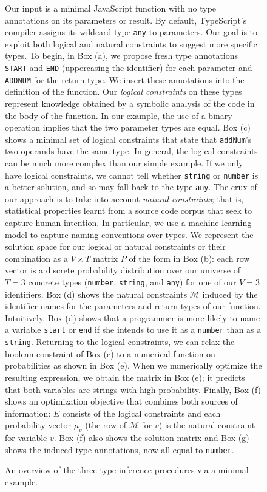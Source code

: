 \documentclass[sigplan,10pt,review,anonymous]{acmart} %
\theoremstyle{plain}
\theoremstyle{remark}
\theoremstyle{definition}
\begin{document}
\begin{figure*}
\vspace{1em}
\begin{minipage}{\textwidth}
Our input is a minimal JavaScript function
with no type annotations on its parameters or result.
%
By default, TypeScript's compiler assigns its wildcard type \lstinline+any+ to
parameters.
%
Our goal is to exploit both logical and natural constraints to suggest
more specific types.
%
To begin, in Box (a), we propose fresh type annotations  \textcolor{mygreen}{\texttt{START}} and \textcolor{mygreen}{\texttt{END}} (uppercasing the identifier) for each parameter and \textcolor{mygreen}{\texttt{ADDNUM}} for the return type.
%
We insert these annotations into the definition of the function.
%
Our \emph{logical constraints} on these types represent knowledge obtained
by a symbolic analysis of the code in the body of the function.
%
In our example, the use of a binary operation implies that the two parameter types are equal.
%
Box (c) shows a minimal set of logical constraints that state
that \lstinline+addNum+'s two operands have the same type.
%
In general, the logical constraints can be much more complex than our simple example.
%
If we only have logical constraints, we cannot tell
whether \lstinline{string} or \lstinline{number} is a better solution,
and so may fall back to the type \lstinline{any}.
%
The crux of our approach is to take into account \emph{natural constraints};
that is, statistical properties learnt from a source code corpus that seek to
capture human intention.
%
In particular, we use a machine learning model to capture naming conventions over types.
%
We represent the solution space for our logical or natural constraints or their combination
as a $V \times T$ matrix $P$ of the form in Box (b):
each row vector is a discrete probability distribution
over our universe of $T=3$ concrete types
(\lstinline{number}, \lstinline{string}, and \lstinline{any}) for one of our $V=3$ identifiers.
%
Box (d) shows the natural constraints $\mathcal{M}$ induced by the identifier names
for the parameters and return types of our function.
%
Intuitively, Box (d) shows that a programmer
is more likely to name a variable \lstinline{start} or \lstinline{end}
if she intends to use it as a \lstinline{number} than as a \lstinline{string}.
%
%
Returning to the logical constraints,
we can relax the boolean constraint of Box (c) to a numerical function on probabilities
as shown in Box (e).
%
When we numerically optimize the resulting expression, we obtain the matrix in Box (e);
it predicts that both variables are strings with high probability.
%
Finally, Box (f) shows an optimization objective that
combines both sources of information:
$E$ consists of the logical constraints
and each probability vector $\mu_v$ (the row of $\mathcal{M}$ for $v$)
is the natural constraint for variable $v$.
%
Box (f) also shows the solution matrix and Box (g) shows the induced type annotations,
now all equal to \lstinline{number}.
\end{minipage}
\caption{An overview of the three type inference procedures via a minimal example.}\label{fig:fullexample}
\end{figure*}
\end{document}
